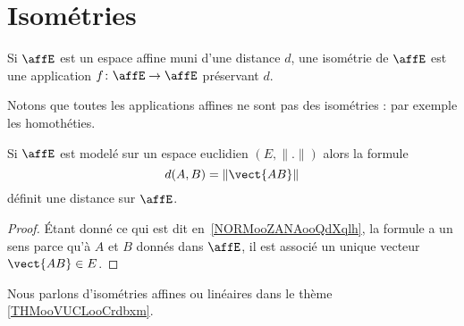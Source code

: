 \section{Isométries}

\begin{definition}       \label{DEFooZGKBooGgjkgs}
     Si \( \affE\) est un espace affine muni d'une distance \( d\), une isométrie de \( \affE\) est une application \( f\colon \affE\to \affE\) préservant \( d\).
\end{definition}
Notons que toutes les applications affines ne sont pas des isométries : par exemple les homothéties.

\begin{proposition}     \label{PROPooHSOGooBbFTYt}
    Si \( \affE\) est modelé sur un espace euclidien \( (E,\| . \|)\) alors la formule
    \begin{equation}
        d(A,B)=\| \vect{ AB } \|
    \end{equation}
    définit une distance sur \( \affE\).
\end{proposition}

\begin{proof}
    Étant donné ce qui est dit en~\ref{NORMooZANAooQdXqlh}, la formule a un sens parce qu'à \( A\) et \( B\) donnés dans \( \affE\), il est associé un unique vecteur \( \vect{ AB }\in E\).
\end{proof}

Nous parlons d'isométries affines ou linéaires dans le thème \ref{THMooVUCLooCrdbxm}.
